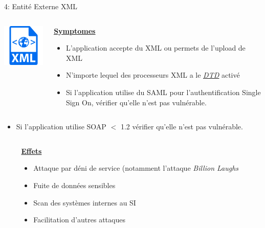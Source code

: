 \documentclass[final,hyperref={pdfpagelabels=false}]{beamer}
\begin{document}
\begin{frame}[t]
\begin{columns}[t]
\begin{column}{.465\textwidth}
\begin{block}{4: Entité Externe XML}
\begin{columns}[T]
			\begin{column}{.12\textwidth} %
				\includegraphics[scale=1.35]{xml.png}
			\end{column}

			\begin{column}{.88\textwidth}
				\uline{\uline{\textbf{Symptomes}}}
				\begin{itemize}
					\item L'application accepte du XML ou permets de l'upload de XML
					\item N'importe lequel des processeurs XML a le
						\href{https://www.w3schools.com/xml/xml_dtd_intro.asp}{\uline{\textit{DTD}}}
						activé
					\item Si l'application utilise du SAML pour l'authentification
						Single Sign On, vérifier qu'elle n'est pas vulnérable.
				\end{itemize}
			\end{column}
		\end{columns}
		\begin{itemize}
			\item Si l'application utilise SOAP $<$ 1.2 vérifier qu'elle n'est
				pas vulnérable.
		\end{itemize}
		\begin{columns}[T]
			\begin{column}{.01\textwidth}
			\end{column}
			\begin{column}{0.495\textwidth}
				\vfill
				\uline{\textbf{Effets}}
				\begin{itemize}
					\item Attaque par déni de service (notamment l'attaque \textit{Billion
						Laughs}
					\item Fuite de données sensibles
					\item Scan des systèmes internes au SI
					\item Facilitation d'autres attaques
				\end{itemize}
				\vfill
			\end{column}
			\begin{column}{0.495\textwidth}

\end{column}
\end{columns}
\end{block}
\end{column}
\end{columns}
\end{frame}
\end{document}
